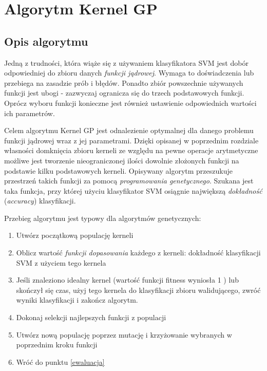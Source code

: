 \chapter{Algorytm Kernel GP}
\section{Opis algorytmu}
Jedną z trudności, która wiąże się z używaniem klasyfikatora SVM jest dobór odpowiedniej do zbioru danych \textit{funkcji jądrowej}. Wymaga to doświadczenia lub przebiega na zasadzie prób i błędów. Ponadto zbiór powszechnie używanych funkcji jest ubogi - zazwyczaj ogranicza się do trzech podstawowych funkcji. Oprócz wyboru funkcji konieczne jest również ustawienie odpowiednich wartości ich parametrów.

Celem algorytmu Kernel GP jest odnalezienie optymalnej dla danego problemu funkcji jądrowej wraz z jej parametrami. Dzięki opisanej w poprzednim rozdziale własności domknięcia zbioru kerneli ze względu na pewne operacje arytmetyczne możliwe jest tworzenie nieograniczonej ilości dowolnie złożonych funkcji na podstawie kilku podstawowych kerneli. Opisywany algorytm przeszukuje przestrzeń takich funkcji za pomocą \textit{programowania genetycznego}. Szukana jest taka funkcja, przy której użyciu klasyfikator SVM osiągnie największą \textit{dokładność} (\textit{accuracy}) klasyfikacji.


Przebieg algorytmu jest typowy dla algorytmów genetycznych:
\begin{enumerate}
\item Utwórz początkową populację kerneli
\item \label{ewaluacja} Oblicz wartość \textit{funkcji dopasowania} każdego z kerneli: dokładność klasyfikacji SVM z użyciem tego kernela
\item Jeśli znaleziono idealny kernel (wartość funkcji fitness wyniosła 1 ) lub skończył się czas, użyj tego kernela do klasyfikacji zbioru walidującego, zwróć wyniki klasyfikacji i zakończ algorytm.
\item Dokonaj selekcji najlepszych funkcji z populacji
\item Utwórz nową populację poprzez mutację i krzyżowanie wybranych w poprzednim kroku funkcji
\item Wróć do punktu \ref{ewaluacja}
\end{enumerate}

